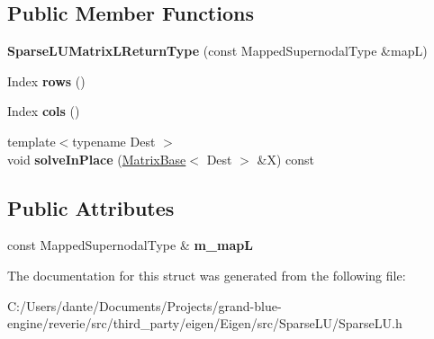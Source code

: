 \subsection*{Public Member Functions}
\begin{DoxyCompactItemize}
\item 
\mbox{\label{struct_eigen_1_1_sparse_l_u_matrix_l_return_type_aadb358a4affbe51e1b6e0a67077266f3}} 
{\bfseries Sparse\+L\+U\+Matrix\+L\+Return\+Type} (const Mapped\+Supernodal\+Type \&mapL)
\item 
\mbox{\label{struct_eigen_1_1_sparse_l_u_matrix_l_return_type_afd8d628e1e8c9a952618ec13184f5081}} 
Index {\bfseries rows} ()
\item 
\mbox{\label{struct_eigen_1_1_sparse_l_u_matrix_l_return_type_ac801def49a9e8a3ac03625b8c47e5a56}} 
Index {\bfseries cols} ()
\item 
\mbox{\label{struct_eigen_1_1_sparse_l_u_matrix_l_return_type_ab164cb4d7d0f0b4402fc8d4b4243a1c2}} 
{\footnotesize template$<$typename Dest $>$ }\\void {\bfseries solve\+In\+Place} (\mbox{\hyperlink{class_eigen_1_1_matrix_base}{Matrix\+Base}}$<$ Dest $>$ \&X) const
\end{DoxyCompactItemize}
\subsection*{Public Attributes}
\begin{DoxyCompactItemize}
\item 
\mbox{\label{struct_eigen_1_1_sparse_l_u_matrix_l_return_type_a393e505ae348939df485651058c2d746}} 
const Mapped\+Supernodal\+Type \& {\bfseries m\+\_\+mapL}
\end{DoxyCompactItemize}


The documentation for this struct was generated from the following file\+:\begin{DoxyCompactItemize}
\item 
C\+:/\+Users/dante/\+Documents/\+Projects/grand-\/blue-\/engine/reverie/src/third\+\_\+party/eigen/\+Eigen/src/\+Sparse\+L\+U/Sparse\+L\+U.\+h\end{DoxyCompactItemize}
